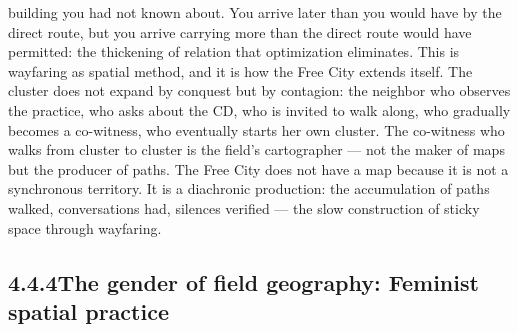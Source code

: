building you had not known about. You arrive later than you would have by the direct route, but you arrive carrying more than the direct route would have permitted: the thickening of relation that optimization eliminates. This is wayfaring as spatial method, and it is how the Free City extends itself. The cluster does not expand by conquest but by contagion: the neighbor who observes the practice, who asks about the CD, who is invited to walk along, who gradually becomes a co-witness, who eventually starts her own cluster. The co-witness who walks from cluster to cluster is the field’s cartographer — not the maker of maps but the producer of paths. The Free City does not have a map because it is not a synchronous territory. It is a diachronic production: the accumulation of paths walked, conversations had, silences verified — the slow construction of sticky space through wayfaring.

\subsection{4.4.4\quad The gender of field geography: Feminist spatial practice}

